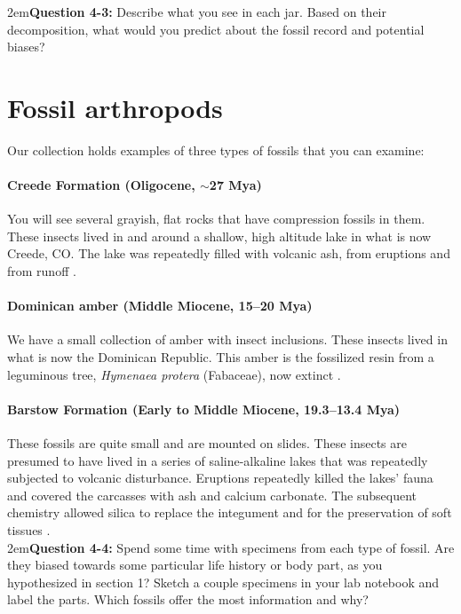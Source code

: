 \documentclass[letterpaper, 11pt]{article}
\begin{document}
\hangindent2em\textbf{Question 4-3:} Describe what you see in each jar. Based on their decomposition, what would you predict about the fossil record and potential biases?

\section{Fossil arthropods}
Our collection holds examples of three types of fossils that you can examine: 

\paragraph{Creede Formation (Oligocene, $\sim$27 Mya)} You will see several grayish, flat rocks that have compression fossils in them. These insects lived in and around a shallow, high altitude lake in what is now Creede, CO. The lake was repeatedly filled with volcanic ash, from eruptions and from runoff \citep{berkeley}.

\paragraph{Dominican amber (Middle Miocene, 15--20 Mya)} We have a small collection of amber with insect inclusions. These insects lived in what is now the Dominican Republic. This amber is the fossilized resin from a leguminous tree, \textit{Hymenaea protera} (Fabaceae), now extinct \citep{IturraldeVinent1850}.

\paragraph{Barstow Formation (Early to Middle Miocene, 19.3--13.4 Mya)} These fossils are quite small and are mounted on slides. These insects are presumed to have lived in a series of saline-alkaline lakes that was repeatedly subjected to volcanic disturbance. Eruptions repeatedly killed the lakes' fauna and covered the carcasses with ash and calcium carbonate. The subsequent chemistry allowed silica to replace the integument and for the preservation of soft tissues \citep{PARK01042001}.\\

\hangindent2em\textbf{Question 4-4:} Spend some time with specimens from each type of fossil. Are they biased towards some particular life history or body part, as you hypothesized in section 1? Sketch a couple specimens in your lab notebook and label the parts. Which fossils offer the most information and why?
\end{document}

